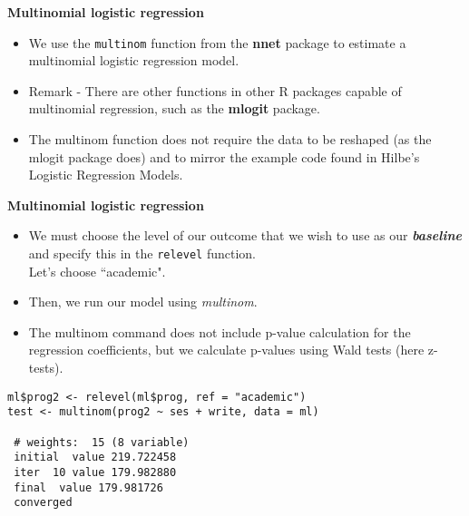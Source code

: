 \documentclass[00-GLMregslides.tex]{subfiles}
\begin{document}
\begin{frame}[fragile]
\Large
\textbf{Multinomial logistic regression}
\begin{itemize}
\item 
We use the \texttt{multinom} function from the \textbf{nnet} package to estimate a multinomial logistic regression model. 

\item Remark - There are other functions in other R packages capable of multinomial regression, such as the \textbf{mlogit} package. 
\item
  The multinom function does not require the data to be reshaped (as the mlogit package does) and to mirror the example code found in Hilbe's Logistic Regression Models.
\end{itemize}
\end{frame}
  \begin{frame}[fragile]
  	\Large
\textbf{Multinomial logistic regression}
\begin{itemize}
\item  We must choose the level of our outcome that we wish to use as our \textbf{\textit{baseline}} and specify this in the \texttt{relevel} function. \\ Let's choose ``academic".
\item Then, we run our model using \textit{multinom}. 
\item The multinom command does not include p-value calculation for the regression coefficients, but we calculate p-values using Wald tests (here z-tests).
 
\end{itemize}
\end{frame}
\begin{frame}[fragile]

\begin{framed}
	\begin{verbatim}
ml$prog2 <- relevel(ml$prog, ref = "academic")
test <- multinom(prog2 ~ ses + write, data = ml)
 
 # weights:  15 (8 variable)
 initial  value 219.722458 
 iter  10 value 179.982880
 final  value 179.981726 
 converged
\end{verbatim}
\end{framed}
\end{frame}
\end{document}
